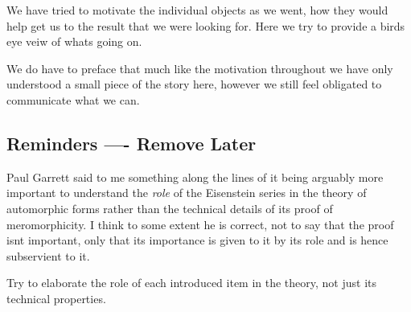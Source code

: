 We have tried to motivate the individual objects as we went, how they would help get us to the result that we were looking for. Here we try to provide a birds eye veiw of whats going on.

We do have to preface that much like the motivation throughout we have only understood a small piece of the story here, however we still feel obligated to communicate what we can.

\subsection{Reminders ---- Remove Later}
Paul Garrett said to me something along the lines of it being arguably more important to understand the \textit{role} of the Eisenstein series in the theory of automorphic forms rather than the technical details of its proof of meromorphicity. I think to some extent he is correct, not to say that the proof isnt important, only that its importance is given to it by its role and is hence subservient to it. 

Try to elaborate the role of each introduced item in the theory, not just its technical properties. 